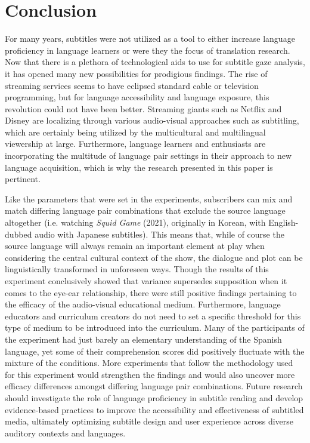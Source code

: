 \section{Conclusion}\label{sec-conclusion}

For many years, subtitles were not utilized as a tool to either increase
language proficiency in language learners or were they the focus of
translation research. Now that there is a plethora of technological aids
to use for subtitle gaze analysis, it has opened many new possibilities
for prodigious findings. The rise of streaming services seems to have
eclipsed standard cable or television programming, but for language
accessibility and language exposure, this revolution could not have been
better. Streaming giants such as Netflix and Disney are localizing
through various audio-visual approaches such as subtitling, which are
certainly being utilized by the multicultural and multilingual
viewership at large. Furthermore, language learners and enthusiasts are
incorporating the multitude of language pair settings in their approach
to new language acquisition, which is why the research presented in this
paper is pertinent.

Like the parameters that were set in the experiments, subscribers can
mix and match differing language pair combinations that exclude the
source language altogether (i.e. watching \emph{Squid Game} (2021),
originally in Korean, with English-dubbed audio with Japanese
subtitles). This means that, while of course the source language will
always remain an important element at play when considering the central
cultural context of the show, the dialogue and plot can be
linguistically transformed in unforeseen ways. Though the results of
this experiment conclusively showed that variance supersedes supposition
when it comes to the eye-ear relationship, there were still positive
findings pertaining to the efficacy of the audio-visual educational
medium. Furthermore, language educators and curriculum creators do not
need to set a specific threshold for this type of medium to be
introduced into the curriculum. Many of the participants of the
experiment had just barely an elementary understanding of the Spanish
language, yet some of their comprehension scores did positively
fluctuate with the mixture of the conditions. More experiments that
follow the methodology used for this experiment would strengthen the
findings and would also uncover more efficacy differences amongst
differing language pair combinations. Future research should investigate
the role of language proficiency in subtitle reading and develop
evidence-based practices to improve the accessibility and effectiveness
of subtitled media, ultimately optimizing subtitle design and user
experience across diverse auditory contexts and languages.
